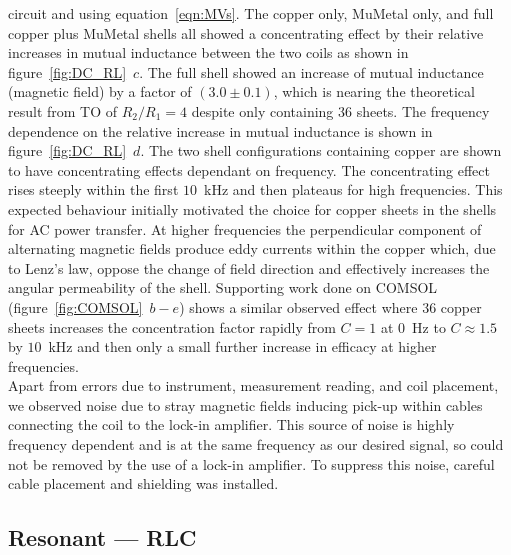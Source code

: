 \documentclass[11pt]{iopart}
\begin{document}
circuit and using equation~\ref{eqn:MVs}. The copper only, MuMetal
only, and full copper plus MuMetal shells all showed a concentrating
effect by their relative increases in mutual inductance between the
two coils as shown in figure~\ref{fig:DC_RL}~$c$. The full shell
showed an increase of mutual inductance (magnetic field) by a factor
of $(3.0\pm0.1)$, which is nearing the theoretical result from TO of
$R_2/R_1 = 4$ despite only containing $36$ sheets. The frequency
dependence on the relative increase in mutual inductance is shown in
figure~\ref{fig:DC_RL}~$d$. The two shell configurations containing
copper are shown to have concentrating effects dependant on
frequency. The concentrating effect rises steeply within the first
$10$~kHz and then plateaus for high frequencies.  This expected
behaviour initially motivated the choice for copper sheets in the
shells for AC power transfer. At higher frequencies the perpendicular
component of alternating magnetic fields produce eddy currents within
the copper which, due to Lenz's law, oppose the change of field
direction and effectively increases the angular permeability of the
shell.  Supporting work done on COMSOL (figure~\ref{fig:COMSOL}~$b-e$)
shows a similar observed effect where $36$ copper sheets increases the
concentration factor rapidly from $C = 1$ at $0$~Hz to $C \approx 1.5$
by $10$~kHz and then only a small further increase in efficacy at
higher frequencies.\\ Apart from errors due to instrument, measurement
reading, and coil placement, we observed noise due to stray magnetic
fields inducing pick-up within cables connecting the coil to the
lock-in amplifier. This source of noise is highly frequency dependent
and is at the same frequency as our desired signal, so could not be
removed by the use of a lock-in amplifier. To suppress this noise,
careful cable placement and shielding was installed. \\

\subsection*{Resonant --- RLC}
\end{document}
